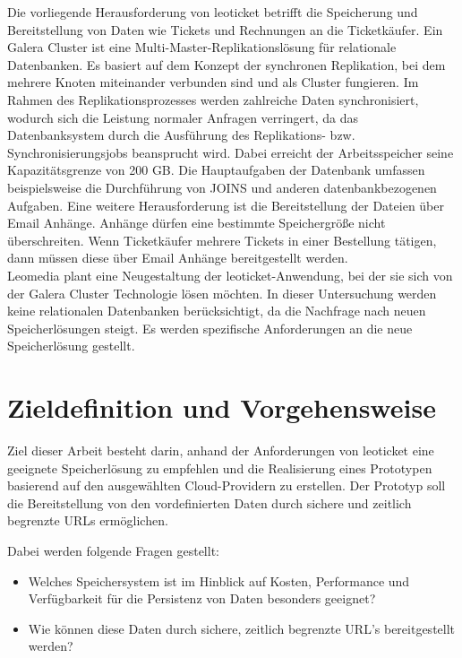 Die vorliegende Herausforderung von leoticket betrifft die Speicherung und Bereitstellung von Daten wie Tickets und Rechnungen an die Ticketkäufer. Ein Galera Cluster ist eine Multi-Master-Replikationslösung für relationale Datenbanken. Es basiert auf dem Konzept der synchronen Replikation, bei dem mehrere Knoten miteinander verbunden sind und als Cluster fungieren. 
Im Rahmen des Replikationsprozesses werden zahlreiche Daten synchronisiert, wodurch sich die Leistung normaler Anfragen verringert, da das Datenbanksystem durch die Ausführung des Replikations- bzw. Synchronisierungsjobs beansprucht wird. Dabei erreicht der Arbeitsspeicher seine Kapazitätsgrenze von 200 GB. Die Hauptaufgaben der Datenbank umfassen beispielsweise die Durchführung von JOINS und anderen datenbankbezogenen Aufgaben. Eine weitere Herausforderung ist die Bereitstellung der Dateien über Email Anhänge. Anhänge dürfen eine bestimmte Speichergröße nicht überschreiten. Wenn Ticketkäufer mehrere Tickets in einer Bestellung tätigen, dann müssen diese über Email Anhänge bereitgestellt werden.\\

Leomedia plant eine Neugestaltung der leoticket-Anwendung, bei der sie sich von der Galera Cluster Technologie lösen möchten. In dieser Untersuchung werden keine relationalen Datenbanken berücksichtigt, da die Nachfrage nach neuen Speicherlösungen steigt. Es werden spezifische Anforderungen an die neue Speicherlösung gestellt.

\newpage

\section{Zieldefinition und Vorgehensweise}

Ziel dieser Arbeit besteht darin, anhand der Anforderungen von leoticket eine geeignete Speicherlösung zu empfehlen und die Realisierung eines Prototypen basierend auf den ausgewählten Cloud-Providern zu erstellen. Der Prototyp soll die Bereitstellung von den vordefinierten Daten durch sichere und zeitlich begrenzte URLs ermöglichen. 

Dabei werden folgende Fragen gestellt:


\begin{itemize}
	\item Welches Speichersystem ist im Hinblick auf Kosten, Performance und Verfügbarkeit für die Persistenz von Daten besonders geeignet? 
	\item Wie können diese Daten durch sichere, zeitlich begrenzte URL's bereitgestellt werden?
\end{itemize}

